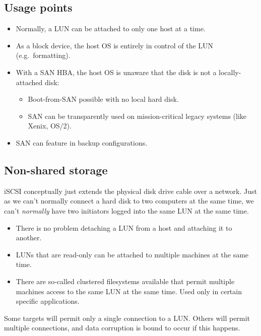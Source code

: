 \subsection{Usage points}\label{usage-points}

\begin{itemize}
\item
  Normally, a LUN can be attached to only one host at a time.
\item
  As a block device, the host OS is entirely in control of the LUN
  (e.g.~formatting).
\item
  With a SAN HBA, the host OS is unaware that the disk is not a
  locally-attached disk:

  \begin{itemize}
  \item
    Boot-from-SAN possible with no local hard disk.
  \item
    SAN can be transparently used on mission-critical legacy systems
    (like Xenix, OS/2).
  \end{itemize}
\item
  SAN can feature in backup configurations.
\end{itemize}

\subsection{Non-shared storage}\label{non-shared-storage}

iSCSI conceptually just extends the physical disk drive cable over a
network. Just as we can't normally connect a hard disk to two computers
at the same time, we can't \emph{normally} have two initiators logged
into the same LUN at the same time.

\begin{itemize}
\item
  There is no problem detaching a LUN from a host and attaching it to
  another.
\item
  LUNs that are read-only can be attached to multiple machines at the
  same time.
\item
  There are so-called clustered filesystems available that permit
  multiple machines access to the same LUN at the same time. Used only
  in certain specific applications.
\end{itemize}

Some targets will permit only a single connection to a LUN. Others will
permit multiple connections, and data corruption is bound to occur if
this happens.

